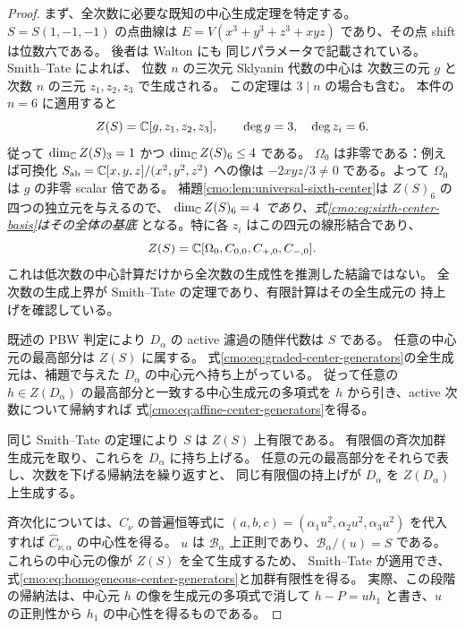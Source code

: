 \begin{proof}
まず、全次数に必要な既知の中心生成定理を特定する。
$S=S(1,-1,-1)$ の点曲線は
$E=V(x^3+y^3+z^3+xyz)$ であり、その点 shift は位数六である。
後者は Walton \cite[Proposition~4.1]{CMOWaltonRepresentations} にも
同じパラメータで記載されている。
Smith--Tate \cite[Theorem~3.7, $r=1$]{GRSklyaninST} によれば、
位数 $n$ の三次元 Sklyanin 代数の中心は
次数三の元 $g$ と次数 $n$ の三元 $z_1,z_2,z_3$ で生成される。
この定理は $3\mid n$ の場合も含む。
本件の $n=6$ に適用すると
\[
 Z(S)=\mathbb C[g,z_1,z_2,z_3],\qquad
 \deg g=3,\quad\deg z_i=6.
\]
従って $\dim_\mathbb C Z(S)_3=1$ かつ $\dim_\mathbb C Z(S)_6\le4$ である。
$\Omega_0$ は非零である：例えば可換化
$S_{\mathrm{ab}}=\mathbb C[x,y,z]/(x^2,y^2,z^2)$ への像は
$-2xyz/3\ne0$ である。よって $\Omega_0$ は $g$ の非零 scalar 倍である。
補題\ref{cmo:lem:universal-sixth-center}は $Z(S)_6$ の四つの独立元を与えるので、
\emph{$\dim_\mathbb C Z(S)_6=4$ であり、式\eqref{cmo:eq:sixth-center-basis}はその全体の基底}
となる。特に各 $z_i$ はこの四元の線形結合であり、
\begin{equation}\label{cmo:eq:graded-center-generators}
 Z(S)=\mathbb C[\Omega_0,C_{0,0},C_{+,0},C_{-,0}].
\end{equation}
これは低次数の中心計算だけから全次数の生成性を推測した結論ではない。
全次数の生成上界が Smith--Tate の定理であり、有限計算はその全生成元の
持上げを確認している。

既述の PBW 判定により $D_\alpha$ の active 濾過の随伴代数は $S$ である。
任意の中心元の最高部分は $Z(S)$ に属する。
式\eqref{cmo:eq:graded-center-generators}の全生成元は、補題で与えた
$D_\alpha$ の中心元へ持ち上がっている。
従って任意の $h\in Z(D_\alpha)$ の最高部分と一致する中心生成元の多項式を
$h$ から引き、active 次数について帰納すれば
式\eqref{cmo:eq:affine-center-generators}を得る。

同じ Smith--Tate の定理により $S$ は $Z(S)$ 上有限である。
有限個の斉次加群生成元を取り、これらを $D_\alpha$ に持ち上げる。
任意の元の最高部分をそれらで表し、次数を下げる帰納法を繰り返すと、
同じ有限個の持上げが $D_\alpha$ を $Z(D_\alpha)$ 上生成する。

斉次化については、$C_\nu$ の普遍恒等式に
$(a,b,c)=(\alpha_1u^2,\alpha_2u^2,\alpha_3u^2)$ を代入すれば
$\widehat C_{\nu,\alpha}$ の中心性を得る。
$u$ は $\mathcal B_\alpha$ 上正則であり、$\mathcal B_\alpha/(u)=S$ である。
これらの中心元の像が $Z(S)$ を全て生成するため、
Smith--Tate \cite[Lemma~3.6]{GRSklyaninST} が適用でき、
式\eqref{cmo:eq:homogeneous-center-generators}と加群有限性を得る。
実際、この段階の帰納法は、中心元 $h$ の像を生成元の多項式で消して
$h-P=u h_1$ と書き、$u$ の正則性から $h_1$ の中心性を得るものである。
\end{proof}


